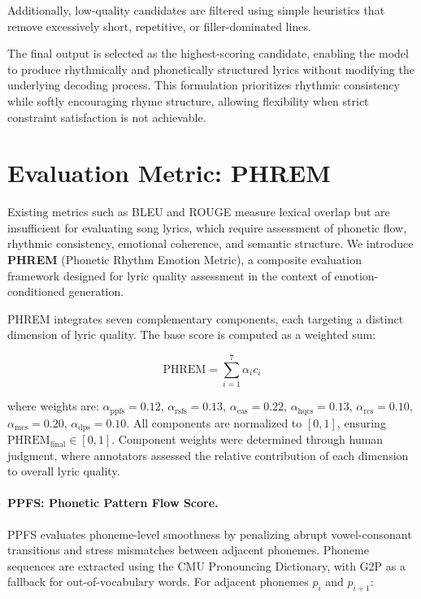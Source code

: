 \documentclass[11pt]{article}
\begin{document}
Additionally, low-quality candidates are filtered using simple heuristics that remove 
excessively short, repetitive, or filler-dominated lines.

The final output is selected as the highest-scoring candidate, enabling 
the model to produce rhythmically and phonetically structured lyrics without 
modifying the underlying decoding process. This formulation prioritizes 
rhythmic consistency while softly encouraging rhyme structure, allowing 
flexibility when strict constraint satisfaction is not achievable.


\section{Evaluation Metric: PHREM}

Existing metrics such as BLEU and ROUGE measure lexical overlap but are 
insufficient for evaluating song lyrics, which require assessment of phonetic 
flow, rhythmic consistency, emotional coherence, and semantic structure. We 
introduce \textbf{PHREM} (Phonetic Rhythm Emotion Metric), a composite 
evaluation framework designed for lyric quality assessment in the context of 
emotion-conditioned generation.

PHREM integrates seven complementary components, each targeting a distinct 
dimension of lyric quality. The base score is computed as a weighted sum:

\begin{equation}
\text{PHREM} = \sum_{i=1}^{7} \alpha_i c_i
\end{equation}

where weights are: $\alpha_{\text{ppfs}}=0.12$, $\alpha_{\text{rsfs}}=0.13$, 
$\alpha_{\text{eas}}=0.22$, $\alpha_{\text{hqcs}}=0.13$, 
$\alpha_{\text{rcs}}=0.10$, $\alpha_{\text{mcs}}=0.20$, $\alpha_{\text{dps}}=0.10$. 
All components are normalized to $[0,1]$, ensuring 
$\text{PHREM}_{\text{final}} \in [0,1]$. Component weights were determined 
through human judgment, where annotators assessed the relative contribution 
of each dimension to overall lyric quality.

\paragraph{PPFS: Phonetic Pattern Flow Score.}
PPFS evaluates phoneme-level smoothness by penalizing abrupt vowel-consonant 
transitions and stress mismatches between adjacent phonemes. Phoneme sequences 
are extracted using the CMU Pronouncing Dictionary, with G2P as a fallback for 
out-of-vocabulary words. For adjacent phonemes $p_i$ and $p_{i+1}$:
\end{document}

